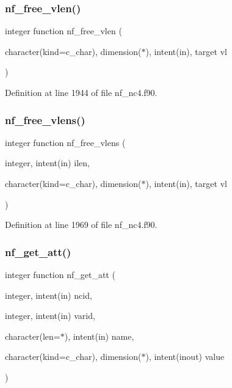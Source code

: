 \subsubsection{\texorpdfstring{nf\+\_\+free\+\_\+vlen()}{nf\_free\_vlen()}}
{\footnotesize\ttfamily integer function nf\+\_\+free\+\_\+vlen (\begin{DoxyParamCaption}\item[{character(kind=c\+\_\+char), dimension($\ast$), intent(in), target}]{vl }\end{DoxyParamCaption})}



Definition at line 1944 of file nf\+\_\+nc4.\+f90.

\mbox{\label{nf__nc4_8f90_abc2eeab21ddb85136f717244aaa2f968}} 
\subsubsection{\texorpdfstring{nf\+\_\+free\+\_\+vlens()}{nf\_free\_vlens()}}
{\footnotesize\ttfamily integer function nf\+\_\+free\+\_\+vlens (\begin{DoxyParamCaption}\item[{integer, intent(in)}]{ilen,  }\item[{character(kind=c\+\_\+char), dimension($\ast$), intent(in), target}]{vl }\end{DoxyParamCaption})}



Definition at line 1969 of file nf\+\_\+nc4.\+f90.

\mbox{\label{nf__nc4_8f90_a9851e7bfb068f31dacee9bd9dd272f53}} 
\subsubsection{\texorpdfstring{nf\+\_\+get\+\_\+att()}{nf\_get\_att()}}
{\footnotesize\ttfamily integer function nf\+\_\+get\+\_\+att (\begin{DoxyParamCaption}\item[{integer, intent(in)}]{ncid,  }\item[{integer, intent(in)}]{varid,  }\item[{character(len=$\ast$), intent(in)}]{name,  }\item[{character(kind=c\+\_\+char), dimension($\ast$), intent(inout)}]{value }\end{DoxyParamCaption})}



